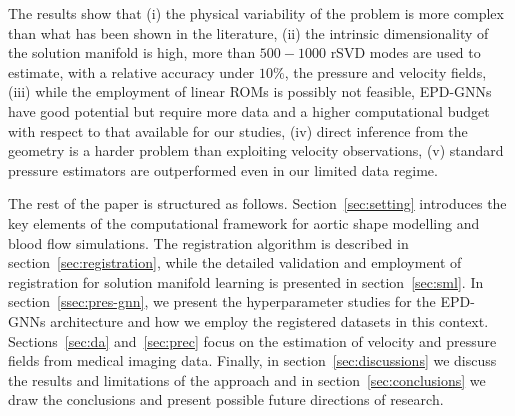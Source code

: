 The results show that (i) the physical variability of the problem is more complex than what has been shown in the literature, (ii) the intrinsic dimensionality of the solution manifold is high, more than $500-1000$ rSVD modes are used to estimate, with a relative accuracy under $10\%$, the pressure and velocity fields, (iii) while the employment of linear ROMs is possibly not feasible, EPD-GNNs have good potential but require more data and a higher computational budget with respect to that available for our studies, (iv) direct inference from the geometry is a harder problem than exploiting velocity observations, (v) standard pressure estimators are outperformed even in our limited data regime.

The rest of the paper is structured as follows. Section~\ref{sec:setting} introduces the key elements of the computational framework for aortic shape modelling and blood flow simulations. The registration algorithm is described in section~\ref{sec:registration}, while the detailed validation and employment of registration for solution manifold learning is presented in section~\ref{sec:sml}. In section~\ref{ssec:pres-gnn}, we present the hyperparameter studies for the EPD-GNNs architecture and how we employ the registered datasets in this context. Sections~\ref{sec:da} and~\ref{sec:prec} focus on the estimation of velocity and pressure fields from medical imaging data. Finally, in section~\ref{sec:discussions} we discuss the results and limitations of the approach and in section~\ref{sec:conclusions} we draw the conclusions and present possible future directions of research.

